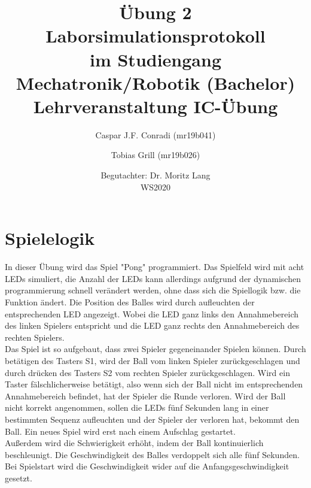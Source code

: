 \documentclass[a4paper]{article}
\title{{\huge Übung 2}\\Laborsimulationsprotokoll\\ \large im Studiengang Mechatronik/Robotik (Bachelor) Lehrveranstaltung IC-Übung}
\date{Begutachter: Dr. Moritz Lang \\ WS2020}
\author{Caspar J.F. Conradi (mr19b041) \and Tobias Grill (mr19b026)}
\begin{document}
    \maketitle
    \newpage

    \setcounter{tocdepth}{1}
    \tableofcontents
    \newpage

    \section{Spielelogik}
     In dieser Übung wird das Spiel "Pong" programmiert. Das Spielfeld wird mit acht LEDs simuliert, die Anzahl der LEDs kann allerdings aufgrund der dynamischen programmierung schnell verändert werden, ohne dass sich die Spiellogik bzw. die Funktion ändert. Die Position des Balles wird durch aufleuchten der entsprechenden LED angezeigt. Wobei die LED ganz links den Annahmebereich des linken Spielers entspricht und die LED ganz rechts den Annahmebereich des rechten Spielers.\\
     Das Spiel ist so aufgebaut, dass zwei Spieler gegeneinander Spielen können. Durch betätigen des Tasters S1, wird der Ball vom linken Spieler zurückgeschlagen und durch drücken des Tasters S2 vom rechten Spieler zurückgeschlagen. Wird ein Taster fälschlicherweise betätigt, also wenn sich der Ball nicht im entsprechenden Annahmebereich befindet, hat der Spieler die Runde verloren. Wird der Ball nicht korrekt angenommen, sollen die LEDs fünf Sekunden lang in einer bestimmten Sequenz aufleuchten und der Spieler der verloren hat, bekommt den Ball. Ein neues Spiel wird erst nach einem Aufschlag gestartet.\\
     Außerdem wird die Schwierigkeit erhöht, indem der Ball kontinuierlich beschleunigt. Die Geschwindigkeit des Balles verdoppelt sich alle fünf Sekunden. Bei Spielstart wird die Geschwindigkeit wider auf die Anfangsgeschwindigkeit gesetzt.
\end{document}
